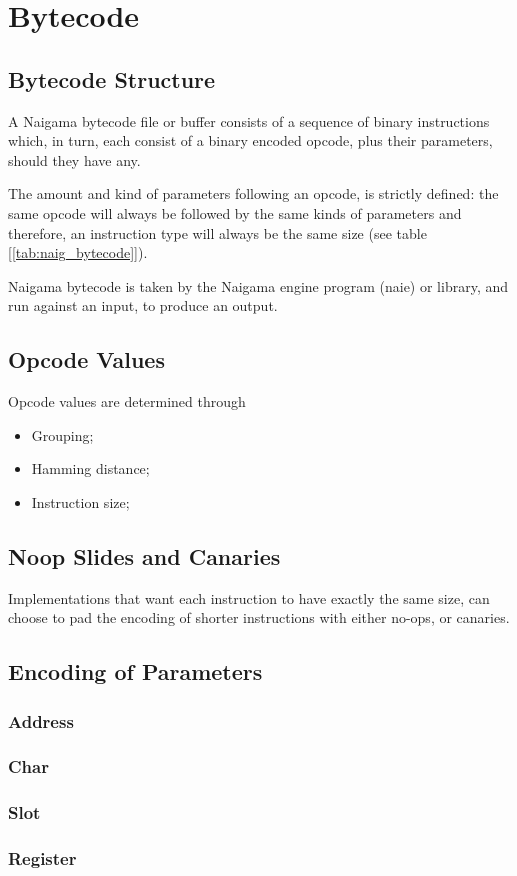 \section{Bytecode}



\subsection{Bytecode Structure}

A Naigama bytecode file or buffer consists of a sequence of binary
instructions which, in turn, each consist of a binary
encoded opcode, plus their parameters, should they have any.

The amount and kind of parameters following an opcode, is strictly
defined:
the same opcode will always be followed by the same kinds of parameters
and therefore, an instruction type will always be the same size
(see table [\ref{tab:naig_bytecode}]).

Naigama bytecode is taken by the Naigama engine program (naie) or
library, and run against an input, to produce an output.

\subsection{Opcode Values}

Opcode values are determined through

\begin{itemize}
\item Grouping; 
\item Hamming distance;
\item Instruction size;
\end{itemize}

\subsection{Noop Slides and Canaries}

Implementations that want each instruction to have exactly the
same size, can choose to pad the encoding of shorter instructions
with either no-ops, or canaries.

\subsection{Encoding of Parameters}

\subsubsection{Address}

\subsubsection{Char}

\subsubsection{Slot}

\subsubsection{Register}
